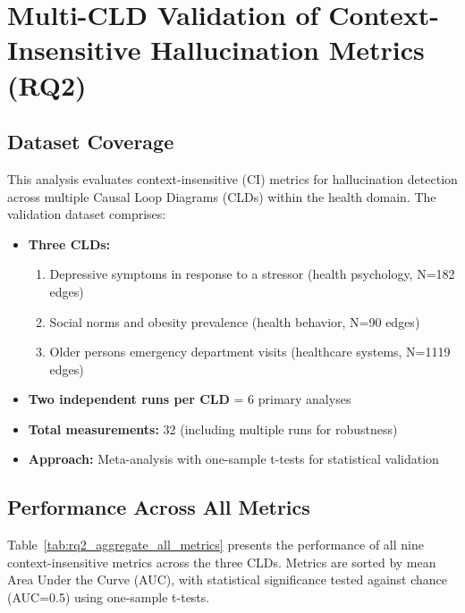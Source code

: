 \chapter{Multi-CLD Validation of Context-Insensitive Hallucination Metrics (RQ2)}
\label{ch:rq2_results}

\section{Dataset Coverage}

This analysis evaluates context-insensitive (CI) metrics for hallucination detection across multiple Causal Loop Diagrams (CLDs) within the health domain. The validation dataset comprises:

\begin{itemize}
    \item \textbf{Three CLDs:}
    \begin{enumerate}
        \item Depressive symptoms in response to a stressor (health psychology, N=182 edges)
        \item Social norms and obesity prevalence (health behavior, N=90 edges)
        \item Older persons emergency department visits (healthcare systems, N=1119 edges)
    \end{enumerate}
    \item \textbf{Two independent runs per CLD} = 6 primary analyses
    \item \textbf{Total measurements:} 32 (including multiple runs for robustness)
    \item \textbf{Approach:} Meta-analysis with one-sample t-tests for statistical validation
\end{itemize}

\section{Performance Across All Metrics}

Table~\ref{tab:rq2_aggregate_all_metrics} presents the performance of all nine context-insensitive metrics across the three CLDs. Metrics are sorted by mean Area Under the Curve (AUC), with statistical significance tested against chance (AUC=0.5) using one-sample t-tests.

